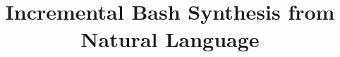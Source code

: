 \documentclass{sig-alternate-05-2015}
\newcommand{\cut}[1]{}
\begin{document}






%

\title{Incremental Bash Synthesis from Natural Language\cut{\titlenote{(Produces the permission block, and
copyright information). For use with
SIG-ALTERNATE.CLS. Supported by ACM.}}}
\cut{\subtitle{[Extended Abstract]
\titlenote{A full version of this paper is available as
\textit{Author's Guide to Preparing ACM SIG Proceedings Using
\LaTeX$2_\epsilon$\ and BibTeX} at
\texttt{www.acm.org/eaddress.htm}}}}
%
%
%
%
%
\end{document}
